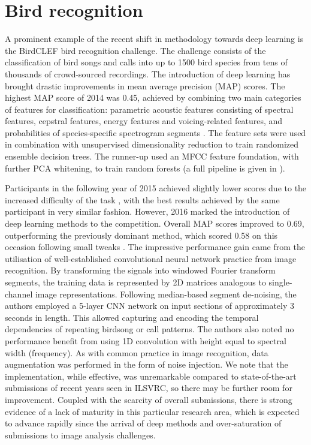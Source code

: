 \documentclass[12pt]{llncs}
\begin{document}
\section{Bird recognition}
\label{sec:birdrecognition}
A prominent example of the recent shift in methodology towards deep learning is the BirdCLEF bird recognition challenge. The challenge consists of the classification of bird songs and calls into up to 1500 bird species from tens of thousands of crowd-sourced recordings. The introduction of deep learning has brought drastic improvements in mean average precision (MAP) scores. The highest MAP score of 2014 was 0.45, achieved by combining two main categories of features for classification: parametric acoustic features consisting of spectral features, cepstral features, energy features and voicing-related features, and probabilities of species-specific spectrogram segments \cite{goeau2014lifeclef}. The feature sets were used in combination with unsupervised dimensionality reduction to train randomized ensemble decision trees. The runner-up used an MFCC feature foundation, with further PCA whitening, to train random forests (a full pipeline is given in \cite[Figure 3]{stowell2014automatic}).

Participants in the following year of 2015 achieved slightly lower scores due to the increased difficulty of the task \cite{goeau2015lifeclef}, with the best results achieved by the same participant in very similar fashion. However, 2016 marked the introduction of deep learning methods to the competition. Overall MAP scores improved to 0.69, outperforming the previously dominant method, which scored 0.58 on this occasion following small tweaks \cite{joly2016lifeclef}. The impressive performance gain came from the utilisation of well-established convolutional neural network practice from image recognition. By transforming the signals into windowed Fourier transform segments, the training data is represented by 2D matrices analogous to single-channel image representations. Following median-based segment de-noising, the authors employed a 5-layer CNN network on input sections of approximately 3 seconds in length. This allowed capturing and encoding the temporal dependencies of repeating birdsong or call patterns. The authors also noted no performance benefit from using 1D convolution with height equal to spectral width (frequency). As with common practice in image recognition, data augmentation was performed in the form of noise injection. We note that the implementation, while effective, was unremarkable compared to state-of-the-art submissions of recent years seen in ILSVRC, so there may be further room for improvement. Coupled with the scarcity of overall submissions, there is strong evidence of a lack of maturity in this particular research area, which is expected to advance rapidly since the arrival of deep methods and over-saturation of submissions to image analysis challenges.
\end{document}
